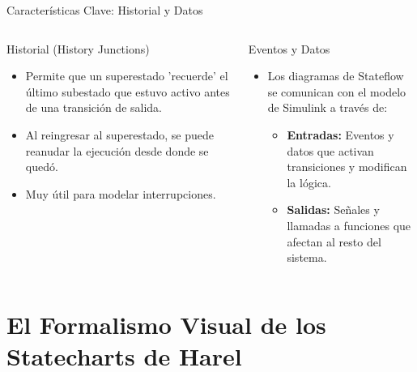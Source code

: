 \documentclass[aspectratio=169,xcolor=dvipsnames]{beamer}
\begin{document}
\begin{frame}{Características Clave: Historial y Datos}
    \begin{columns}[t]
            \begin{block}{Historial (History Junctions)}
                \begin{itemize}
                    \item Permite que un superestado 'recuerde' el último subestado que estuvo activo antes de una transición de salida.
                    \item Al reingresar al superestado, se puede reanudar la ejecución desde donde se quedó.
                    \item Muy útil para modelar interrupciones.
                \end{itemize}
            \end{block}

            \begin{alertblock}{Eventos y Datos}
                 \begin{itemize}
                    \item Los diagramas de Stateflow se comunican con el modelo de Simulink a través de:
                        \begin{itemize}
                            \item \textbf{Entradas:} Eventos y datos que activan transiciones y modifican la lógica.
                            \item \textbf{Salidas:} Señales y llamadas a funciones que afectan al resto del sistema.
                        \end{itemize}
                \end{itemize}
            \end{alertblock}
    \end{columns}
\end{frame}

\section{El Formalismo Visual de los Statecharts de Harel}
\end{document}
